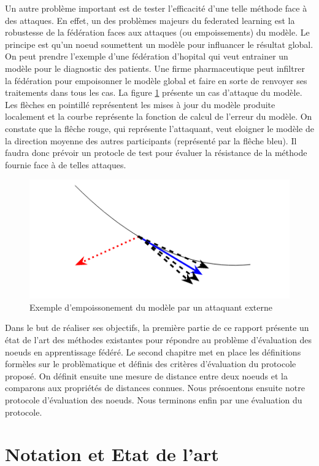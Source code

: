 \documentclass[stage3a]{tnreport} %
\begin{document}
Un autre problème important est de tester l'efficacité d'une telle méthode face à des attaques. En effet, un des problèmes majeurs du federated learning est la robustesse de la fédération faces aux attaques (ou empoissements) du modèle. Le principe est qu'un noeud soumettent un modèle pour influancer
 le résultat global. On peut prendre l'exemple d'une fédération d'hopital qui veut entrainer un modèle pour le diagnostic des patients. Une firme pharmaceutique peut infiltrer la fédération pour empoisonner le modèle global et faire en sorte de renvoyer ses traitements dans tous les cas. La figure \ref{fig:attack_schema} présente un cas d'attaque du modèle. Les flèches en pointillé représentent les mises à jour du modèle produite localement et la courbe représente la fonction de calcul de l'erreur du modèle. On constate que la flêche rouge, qui représente l'attaquant, veut eloigner le modèle de la direction moyenne des autres participants (représenté par la flêche bleu). Il faudra donc prévoir un protocle de test pour évaluer la résistance de la méthode fournie face à de telles attaques.

\begin{figure}[H]
  \centering
  \includegraphics[]{figures/bizantine.png}
  \caption{Exemple d'empoissonement du modèle par un attaquant externe}
  \label{fig:attack_schema}
\end{figure}


Dans le but de réaliser ses objectifs, la première partie de ce rapport présente un état de l'art des méthodes existantes pour répondre au problème d'évaluation des noeuds en apprentissage fédéré. Le second chapitre met en place les définitions formèles sur le problèmatique et définis des critères d'évaluation du protocole proposé. On définit ensuite une mesure de distance entre deux noeuds et la comparons aux propriétés de distances connues. Nous présoentons ensuite notre protocole d'évaluation des noeuds. Nous terminons enfin par une évaluation du protocole.

\chapter{Notation et Etat de l'art}
\end{document}
